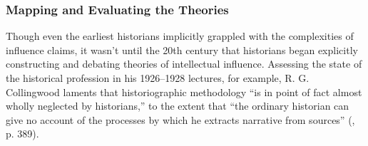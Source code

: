 \documentclass[11pt]{article}
\begin{document}

\subsubsection{Mapping and Evaluating the Theories}\label{sec:mapping-theories}

Though even the earliest historians implicitly grappled with the complexities of influence claims, it wasn't until the 20th century that historians began explicitly constructing and debating theories of intellectual influence. Assessing the state of the historical profession in his 1926--1928 lectures, for example, R. G. Collingwood laments that historiographic methodology ``is in point of fact almost wholly neglected by historians,'' to the extent that ``the ordinary historian can give no account of the processes by which he extracts narrative from sources'' (\cite{collingwood_idea_1946}, p. 389).
\end{document}
